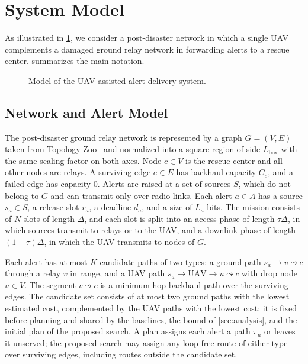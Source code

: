 \section{System Model}
\label{sec:system}

As illustrated in \cref{fig:system}, we consider a post-disaster network in which a single UAV complements a damaged ground relay network in forwarding alerts to a rescue center.  summarizes the main notation.

\begin{figure}[htbp]
\centering
\resizebox{0.9\textwidth}{!}{}
\caption{Model of the UAV-assisted alert delivery system.}
\label{fig:system}
\end{figure}

\subsection{Network and Alert Model}
\label{sec:model}

The post-disaster ground relay network is represented by a graph $G=(V,E)$ taken from Topology Zoo~\cite{knight2011zoo} and normalized into a square region of side $L_{\mathrm{box}}$ with the same scaling factor on both axes. Node $c\in V$ is the rescue center and all other nodes are relays. A surviving edge $e\in E$ has backhaul capacity $C_e$, and a failed edge has capacity $0$. Alerts are raised at a set of sources $S$, which do not belong to $G$ and can transmit only over radio links. Each alert $a\in A$ has a source $s_a\in S$, a release slot $r_a$, a deadline $d_a$, and a size of $L_a$ bits. The mission consists of $N$ slots of length $\Delta$, and each slot is split into an access phase of length $\tau\Delta$, in which sources transmit to relays or to the UAV, and a downlink phase of length $(1-\tau)\Delta$, in which the UAV transmits to nodes of $G$.

Each alert has at most $K$ candidate paths of two types: a ground path $s_a\to v\leadsto c$ through a relay $v$ in range, and a UAV path $s_a\to\text{UAV}\to u\leadsto c$ with drop node $u\in V$. The segment $v\leadsto c$ is a minimum-hop backhaul path over the surviving edges. The candidate set consists of at most two ground paths with the lowest estimated cost, complemented by the UAV paths with the lowest cost; it is fixed before planning and shared by the baselines, the bound of \cref{sec:analysis}, and the initial plan of the proposed search. A plan assigns each alert a path $\pi_a$ or leaves it unserved; the proposed search may assign any loop-free route of either type over surviving edges, including routes outside the candidate set.

